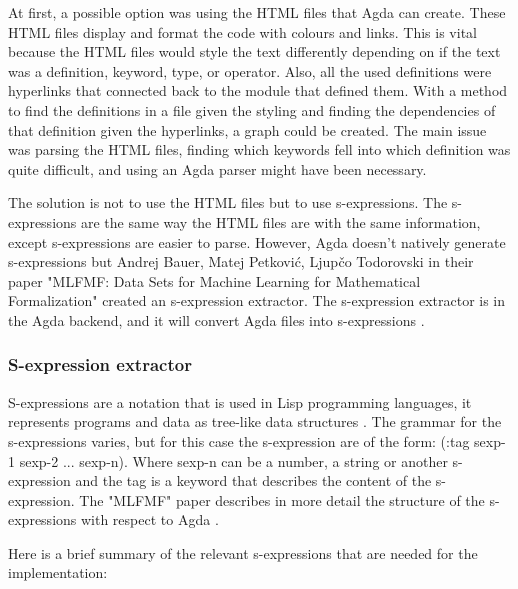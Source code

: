 At first, a possible option was using the HTML files that Agda can create.
These HTML files display and format the code with colours and links. This is
vital because the HTML files would style the text differently depending on if the
text was a definition, keyword, type, or operator. Also, all the used definitions
were hyperlinks that connected back to the module that defined them. With a
method to find the definitions in a file given the styling and finding the
dependencies of that definition given the hyperlinks, a graph could be created.
The main issue was parsing the HTML files, finding which keywords fell into
which definition was quite difficult, and using an Agda parser might have been
necessary.

The solution is not to use the HTML files but to use s-expressions. The
s-expressions are the same way the HTML files are with the same information,
except s-expressions are easier to parse. However, Agda doesn't natively
generate s-expressions but Andrej Bauer, Matej Petković, Ljupčo Todorovski in
their paper "MLFMF: Data Sets for Machine Learning for Mathematical
Formalization" \cite{bauer2023mlfmf} created an s-expression extractor. The
s-expression extractor is in the Agda backend, and it will convert Agda files into
s-expressions \cite{andrej}.

\subsubsection{S-expression extractor}

S-expressions are a notation that is used in Lisp programming languages, it
represents programs and data as tree-like data structures \cite{sexp}. The grammar for the
s-expressions varies, but for this case the s-expression are of the form: (:tag
sexp-1 sexp-2 ... sexp-n). Where sexp-n can be a number, a string or another
s-expression and the tag is a keyword that describes the content of the
s-expression. The "MLFMF" paper describes in more detail
the structure of the s-expressions with respect to Agda \cite{bauer2023mlfmf}.

Here is a brief summary of the relevant s-expressions that are needed for the implementation:

